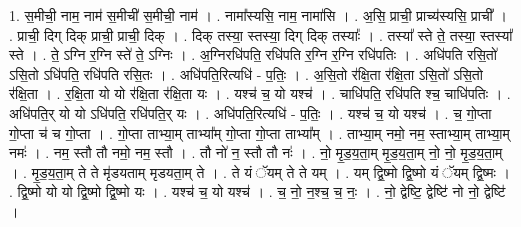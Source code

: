 \documentclass[17pt]{extarticle}
\begin{document}
1. स॒मीची॒ नाम॒ नाम॑ स॒मीची॑ स॒मीची॒ नाम॑ । . नामा᳚स्यसि॒ नाम॒ नामा॑सि । . अ॒सि॒ प्राची॒ प्राच्य॑स्यसि॒ प्राची᳚ । . प्राची॒ दिग् दिक् प्राची॒ प्राची॒ दिक् । . दिक् तस्या॒ स्तस्या॒ दिग् दिक् तस्याः᳚ । . तस्या᳚ स्ते ते॒ तस्या॒ स्तस्या᳚ स्ते । . ते॒ ऽग्नि र॒ग्नि स्ते॑ ते॒ ऽग्निः । . अ॒ग्निरधि॑पति॒ रधि॑पति र॒ग्नि र॒ग्नि रधि॑पतिः । . अधि॑पति रसि॒तो॑ ऽसि॒तो ऽधि॑पति॒ रधि॑पति रसि॒तः । . अधि॑पति॒रित्यधि॑ - प॒तिः॒ । . अ॒सि॒तो र॑क्षि॒ता र॑क्षि॒ता ऽसि॒तो॑ ऽसि॒तो र॑क्षि॒ता । . र॒क्षि॒ता यो यो र॑क्षि॒ता र॑क्षि॒ता यः । . यश्च॑ च॒ यो यश्च॑ । . चाधि॑पति॒ रधि॑पति श्च॒ चाधि॑पतिः । . अधि॑पति॒र् यो यो ऽधि॑पति॒ रधि॑पति॒र् यः । . अधि॑पति॒रित्यधि॑ - प॒तिः॒ । . यश्च॑ च॒ यो यश्च॑ । . च॒ गो॒प्ता गो॒प्ता च॑ च गो॒प्ता । . गो॒प्ता ताभ्या॒म् ताभ्या᳚म् गो॒प्ता गो॒प्ता ताभ्या᳚म् । . ताभ्या॒म् नमो॒ नम॒ स्ताभ्या॒म् ताभ्या॒म् नमः॑ । . नम॒ स्तौ तौ नमो॒ नम॒ स्तौ । . तौ नो॑ न॒ स्तौ तौ नः॑ । . नो॒ मृ॒ड॒य॒ता॒म् मृ॒ड॒य॒ता॒म् नो॒ नो॒ मृ॒ड॒य॒ता॒म् । . मृ॒ड॒य॒ता॒म् ते ते मृ॑डयताम् मृडयता॒म् ते । . ते यं ॅयम् ते ते यम् । . यम् द्वि॒ष्मो द्वि॒ष्मो यं ॅयम् द्वि॒ष्मः । . द्वि॒ष्मो यो यो द्वि॒ष्मो द्वि॒ष्मो यः । . यश्च॑ च॒ यो यश्च॑ । . च॒ नो॒ न॒श्च॒ च॒ नः॒ । . नो॒ द्वेष्टि॒ द्वेष्टि॑ नो नो॒ द्वेष्टि॑ । \newline
\end{document}
